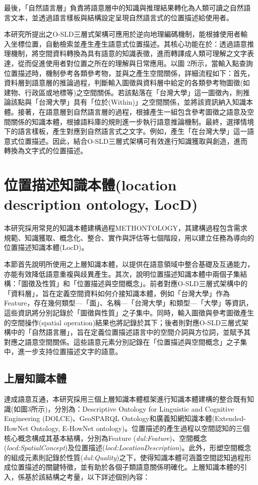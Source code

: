 最後，「自然語言層」負責將語意層中的知識與推理結果轉化為人類可讀之自然語言文本，並透過語言樣板與結構設定呈現自然語言式的位置描述給使用者。

本研究所提出之O-SLD三層式架構可應用於逆向地理編碼機制，能根據使用者輸入坐標位置，自動檢索並產生產生語意式位置描述。其核心功能在於：透過語意推理機制，將空間資料轉換為具有語意的知識表徵，進而轉譯成人類可理解之文字表達，從而促進使用者對位置之所在的理解與日常應用。以圖 2所示，當輸入點查詢位置描述時，機制參考各類參考物，並與之產生空間關係，詳細流程如下：首先，資料層到語意層的推論過程，判斷輸入圖徵與資料層中給定的各類參考物圖徵(如建物、行政區或地標等)之空間關係。若該點落在「台灣大學」這一圖徵內，則推論該點與「台灣大學」具有「位於(Within)」之空間關係，並將該資訊納入知識本體。接著，在語意層到自然語言層的過程，根據產生一組包含參考圖徵之語意及空間關係的知識本體，根據語料庫的規則進一步執行語意推論機制。最終，選擇情境下的語言樣板，產生對應到自然語言式之文字。例如，產生「在台灣大學」這一語意式位置描述。因此，結合O-SLD三層式架構可有效進行知識獲取與創造，進而轉換為文字式的位置描述。

\section{位置描述知識本體(location description ontology, LocD)}

本研究採用常見的知識本體建構過程METHONTOLOGY\citep{RN143}，其建構過程包含需求規範、知識獲取、概念化、整合、實作與評估等七個階段，用以建立任務為導向的位置描述知識本體(LocD)。

本節首先說明所使用之上層知識本體，以提供在語意領域中整合基礎及互通能力，亦能有效降低語意重複與歧異產生。其次，說明位置描述知識本體中兩個子集結構：「圖徵及性質」和「位置描述與空間概念」。前者對應O-SLD三層式架構中的「資料層」，旨在定義空間資料如何介接知識本體，例如「台灣大學」作為Feature，存在幾何類型—「面」、名稱—「台灣大學」和類型—「大學」等資訊，這些資訊將分別記錄於「圖徵與性質」之子集中。同時，輸入圖徵與參考圖徵產生的空間操作(spatial operation)結果也將記錄於其下；後者則對應O-SLD三層式架構中的「自然語言層」，旨在定義位置描述語言中的空間介詞與方位詞，並賦予其對應之語意空間關係。這些語意元素分別記錄在「位置描述與空間概念」之子集中，進一步支持位置描述文字的語意。

\subsection{上層知識本體}

達成語意互通，本研究採用三個上層知識本體框架進行知識本體建構的整合既有知識(如圖3所示)，分別為：Descriptive Ontology for Linguistic and Cognitive Engineering (DOLCE)、GeoSPARQL Ontology和廣義知網知識本體(Extended-HowNet Ontology, E-HowNet ontology)。位置描述的產生過程以空間認知的三個核心概念構成其基本結構，分別為Feature (\textit{dul:Feature})、空間概念(\textit{locd:SpatialConcept})及位置描述(\textit{locd:LocationDescription})。此外，形塑空間概念的組成元素則記錄於性質(\textit{dul:Quality})之下，使得知識本體可涵蓋空間認知過程形成位置描述的關鍵特徵，並有助於各個子類語意關係明確化。上層知識本體的引入，係基於該結構之考量，以下詳述個別內容：

